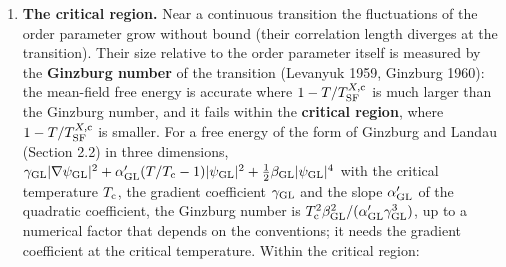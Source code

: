 \documentclass[
  10pt,
]{article}
\providecommand{\tightlist}{%
  \setlength{\itemsep}{0pt}\setlength{\parskip}{0pt}}
\begin{document}
\begin{enumerate}
\def\labelenumi{\arabic{enumi}.}
\tightlist
\item
  \textbf{The critical region.} Near a continuous transition the
  fluctuations of the order parameter grow without bound (their
  correlation length diverges at the transition). Their size relative to
  the order parameter itself is measured by the \textbf{Ginzburg number}
  of the transition (Levanyuk 1959, Ginzburg 1960): the mean-field free
  energy is accurate where \(1-T/T^{X,{\rm c}}_{\rm SF}\) is much larger
  than the Ginzburg number, and it fails within the \textbf{critical
  region}, where \(1-T/T^{X,{\rm c}}_{\rm SF}\) is smaller. For a free
  energy of the form of Ginzburg and Landau (Section 2.2) in three
  dimensions,
  \(\gamma_{\rm GL}\lvert\nabla\psi_{\rm GL}\rvert^2+\alpha'_{\rm GL}(T/T_{\rm c}-1)\lvert\psi_{\rm GL}\rvert^2+\tfrac12\beta_{\rm GL}\lvert\psi_{\rm GL}\rvert^4\)
  with the critical temperature \(T_{\rm c}\), the gradient coefficient
  \(\gamma_{\rm GL}\) and the slope \(\alpha'_{\rm GL}\) of the
  quadratic coefficient, the Ginzburg number is
  \(T_{\rm c}^2\beta_{\rm GL}^2/(\alpha'_{\rm GL}\gamma_{\rm GL}^3)\),
  up to a numerical factor that depends on the conventions; it needs the
  gradient coefficient at the critical temperature. Within the critical
  region:


\end{enumerate}
\end{document}
